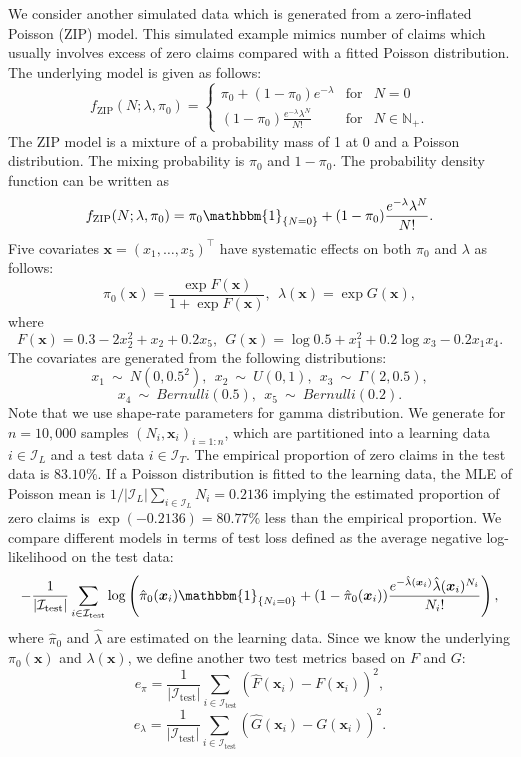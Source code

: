 \documentclass[11pt]{article}
\numberwithin{equation}{section}
\def\N{{\mathbb N}}  %
\def\bx{\boldsymbol{x}}
\begin{document}
We consider another simulated data which is generated from a zero-inflated Poisson (ZIP) model. This simulated example mimics number of claims which usually involves excess of zero claims compared with a fitted Poisson distribution.
The underlying  model is given as follows:
 \begin{equation}
	f_{\text{ZIP}}(N;\lambda,\pi_0) = \left\{ 
	\begin{array}{ccl}
		\pi_0+(1-\pi_0)e^{-\lambda} & \mbox{for}
		& N=0 \\
		(1-\pi_0)\frac{e^{-\lambda}\lambda^N}{N!} & \mbox{for} &N\in\N_+.
	\end{array}\right.
\end{equation}
The ZIP model is a mixture of a probability mass of 1 at 0 and a Poisson distribution. The mixing probability is $\pi_0$ and $1-\pi_0$.
The probability density function can be written as
$$f_\text{ZIP}(N;\lambda,\pi_0)= \pi_0\mathbbm{1}_{\{N=0\}} + 
(1-\pi_0)\frac{e^{-\lambda}\lambda^N}{N!}.$$
Five covariates $\bx=(x_1,\ldots,x_5)^\top$ have systematic effects on both $\pi_0$ and $\lambda$ as follows:
\begin{equation}
	\pi_0(\bx)=\frac{\exp F(\bx)}{1+\exp F(\bx)}, ~~
	\lambda(\bx)=\exp G(\bx), 
\end{equation}
where
\begin{equation}
	 F(\bx)=0.3-2x_2^2+x_2+0.2x_5, ~~G(\bx)=\log 0.5+x_1^2 + 0.2\log x_3 - 0.2x_1 x_4.
\end{equation}
The covariates are generated from the following distributions:
$$	x_1~\sim~N(0,0.5^2), ~~ x_2~\sim~U(0,1), ~~ x_3~\sim~\Gamma(2,0.5),$$ $$x_4~\sim~Bernulli(0.5),~~ x_5~\sim~Bernulli(0.2).$$
Note that we use shape-rate parameters for gamma distribution.
We generate for $n=10,000$ samples $(N_i,\bx_i)_{i=1:n}$, which are partitioned into a learning data $i\in\mathcal{I}_{L}$ and a test data $i\in\mathcal{I}_{T}$. 
The empirical proportion of zero claims in the test data is $83.10\%$. If a Poisson distribution is fitted to the learning data, the MLE of Poisson mean is $1/|\mathcal{I}_L|\sum_{i\in\mathcal{I}_L}N_i=0.2136$ implying the estimated proportion of zero claims is $\exp(-0.2136)=80.77\%$ less than the empirical proportion. 
We compare different models in terms of test loss defined as the average negative log-likelihood on the test data:
\begin{equation}
-\frac{1}{|\mathcal{I}_\text{test}|}\sum_{i\in\mathcal{I}_\text{test}}\log \left(\hat{\pi}_0(\bx_i)\mathbbm{1}_{\{N_i=0\}} + 
(1-\hat{\pi}_0(\bx_i))\frac{e^{-\hat{\lambda}(\bx_i)}\hat{\lambda}(\bx_i)^{N_i}}{N_i!}\right),
\end{equation} 
where $\hat{\pi}_0$ and $\hat{\lambda}$ are estimated on the learning data. 
Since we know the underlying $\pi_0(\bx)$ and $\lambda(\bx)$, we define another two test metrics based on $F$ and $G$:
\begin{equation}\label{t1}
e_\pi=\frac{1}{|\mathcal{I}_\text{test}|}\sum_{i\in\mathcal{I}_\text{test}}(\hat{F}(\bx_i)-F(\bx_i))^2,
\end{equation}
\begin{equation}\label{t2}
e_\lambda=\frac{1}{|\mathcal{I}_\text{test}|}\sum_{i\in\mathcal{I}_\text{test}}(\hat{G}(\bx_i)-G(\bx_i))^2.
\end{equation}
\end{document}
